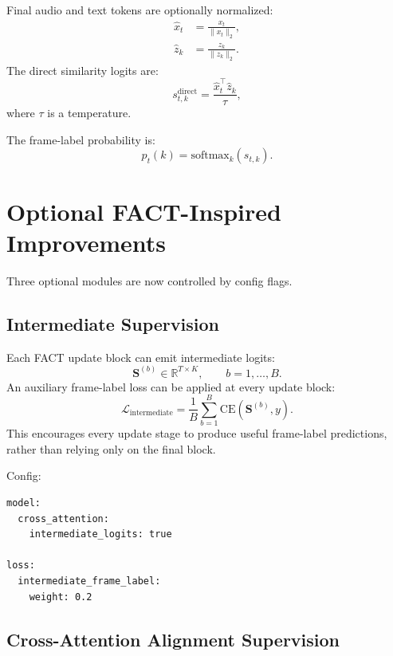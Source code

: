 \documentclass[11pt,a4paper]{article}
\newcommand{\logits}{\mathbf{S}}
\begin{document}
Final audio and text tokens are optionally normalized:
\begin{align}
  \hat{x}_t &= \frac{x_t}{\|x_t\|_2}, \\
  \hat{z}_k &= \frac{z_k}{\|z_k\|_2}.
\end{align}
The direct similarity logits are:
\begin{equation}
  s_{t,k}^{\mathrm{direct}}
  =
  \frac{\hat{x}_t^\top \hat{z}_k}{\tau},
\end{equation}
where $\tau$ is a temperature.

The frame-label probability is:
\begin{equation}
  p_t(k) =
  \mathrm{softmax}_k(s_{t,k}).
\end{equation}

\section{Optional FACT-Inspired Improvements}

Three optional modules are now controlled by config flags.

\subsection{Intermediate Supervision}

Each FACT update block can emit intermediate logits:
\begin{equation}
  \logits^{(b)} \in \mathbb{R}^{T \times K}, \qquad b = 1,\ldots,B.
\end{equation}
An auxiliary frame-label loss can be applied at every update block:
\begin{equation}
  \mathcal{L}_{\mathrm{intermediate}}
  =
  \frac{1}{B}\sum_{b=1}^{B}
  \mathrm{CE}(\logits^{(b)}, y).
\end{equation}
This encourages every update stage to produce useful frame-label predictions, rather
than relying only on the final block.

Config:
\begin{verbatim}
model:
  cross_attention:
    intermediate_logits: true

loss:
  intermediate_frame_label:
    weight: 0.2
\end{verbatim}

\subsection{Cross-Attention Alignment Supervision}
\end{document}
